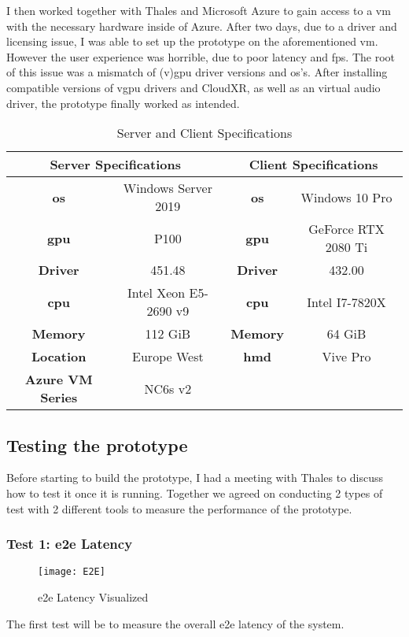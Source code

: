 I then worked together with Thales and Microsoft Azure to gain access to a \acrfull{vm} with the necessary hardware inside of Azure. After two days, due to a driver and licensing issue, I was able to set up the prototype on the aforementioned \acrshort{vm}. However the user experience was horrible, due to poor latency and \acrshort{fps}. The root of this issue was a mismatch of (v)\acrshort{gpu} driver versions and \acrfull{os}'s. After installing compatible versions of v\acrshort{gpu} drivers and CloudXR, as well as an virtual audio driver, the prototype finally worked as intended.

\begin{table}[h]	
\begin{center}
\caption{Server and Client Specifications}
\begin{tabular}{ |c|c|c|c| } 
\hline
\multicolumn{2}{|c|}{Server Specifications} & \multicolumn{2}{|c|}{Client Specifications}\\ 
\hline\hline
\textbf{\acrshort{os}} & Windows Server 2019  &  \textbf{\acrshort{os}} & Windows 10 Pro\\ 
\hline
\textbf{\acrshort{gpu}} & P100 & \textbf{\acrshort{gpu}} & GeForce RTX 2080 Ti\\ 
\hline
\textbf{Driver} & 451.48 &  \textbf{Driver} & 432.00\\ 
\hline
\textbf{\acrshort{cpu}} & Intel Xeon E5-2690 v9 & \textbf{\acrshort{cpu}} & Intel I7-7820X\\
\hline
\textbf{Memory} & 112 GiB & \textbf{Memory} & 64 GiB\\
\hline
\textbf{Location} & Europe West & \textbf{\acrshort{hmd}} & Vive Pro\\
\hline
\textbf{Azure VM Series} & NC6s v2 & & \\
\hline
\end{tabular}
\end{center}

\end{table}

\subsection{Testing the prototype}
Before starting to build the prototype, I had a meeting with Thales to discuss how to test it once it is running. Together we agreed on conducting 2 types of test with 2 different tools to measure the performance of the prototype.

\subsubsection{Test 1: \acrfull{e2e} Latency}
\begin{figure}[h!]
\caption{\acrfull{e2e} Latency Visualized \parencite{e2e}}
\label{fig:e2e}
\texttt{[image: E2E]}
\end{figure}
The first test will be to measure the overall \acrshort{e2e} latency of the system.

